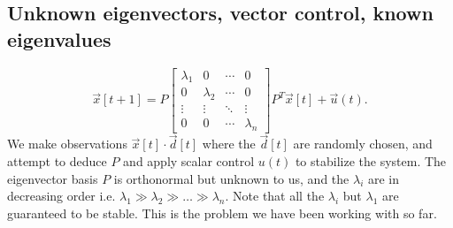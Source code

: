 \documentclass[letterpaper]{article}
\theoremstyle{remark}
\newcommand{\mat}[1]{\ensuremath{\begin{bmatrix}#1\end{bmatrix}}}
\begin{document}
\subsection*{Unknown eigenvectors, vector control, known eigenvalues}
\[
    \vec{x}[t + 1] = P\mat{\lambda_1 & 0 & \cdots & 0 \\ 0 & \lambda_2 & \cdots & 0 \\ \vdots  & \vdots & \ddots & \vdots \\ 0 & 0 & \cdots & \lambda_n}P^T \vec{x}[t] + \vec{u}(t).
\]
We make observations $\vec{x}[t] \cdot \vec{d}[t]$ where the $\vec{d}[t]$ are randomly chosen, and attempt to deduce $P$ and apply scalar control $u(t)$ to stabilize the system. The eigenvector basis $P$ is orthonormal but unknown to us, and the $\lambda_i$ are in decreasing order i.e. $\lambda_1 \gg \lambda_2 \gg \ldots \gg \lambda_n$. Note that all the $\lambda_i$ but $\lambda_1$ are guaranteed to be stable. This is the problem we have been working with so far.
\end{document}
